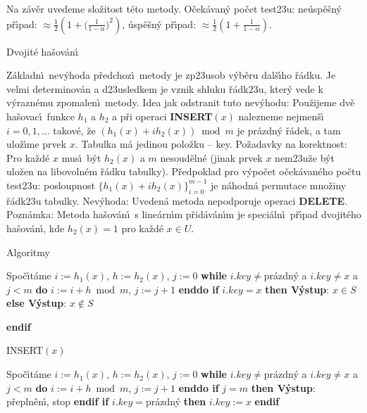 \documentclass[a4paper,12pt]{article}
\begin{document}
\flushpar Na z\'av\v er uvedeme slo\v zitost t\'eto metody. O\v cek\'avan\'y 
po\v cet test\accent23u:\newline 
\phantom{---}ne\'usp\v e\v sn\'y p\v r\'\i pad: $\approx\frac 12(
1+\big(\frac 1{1-\alpha}\big)^2)$, \newline 
\phantom{---}\'usp\v e\v sn\'y p\v r\'\i pad: $\approx\frac 12(1+\frac 
1{1-\alpha})$.

\heading
Dvojit\'e ha\v sov\'an\'\i
\endheading

\flushpar Z\'akladn\'\i\ nev\'yhoda p\v redchoz\'\i\ metody je zp\accent23usob 
v\'yb\v eru dal\-\v s\'\i\-ho \v r\'adku. Je velmi determinov\'an a 
d\accent23usledkem je vznik shluku \v r\'adk\accent23u, kter\'y 
vede k v\'yrazn\'emu zpomalen\'\i\ metody. \newline 
Idea jak odstranit tuto nev\'yhodu: Pou\v zijeme dv\v e 
ha\v sovac\'\i\ funkce $h_1$ a $h_2$ a p\v ri operaci {\bf INSERT$
(x)$ }
nalezneme nejmen\v s\'\i\ $i=0,1,\dots$ takov\'e, \v ze 
$(h_1(x)+ih_2(x))\bmod m$ je pr\'azdn\'y \v r\'adek, a tam ulo\v z\'\i me 
prvek $x$.\newline 
Tabulka m\'a jedinou polo\v zku -- key.\newline 
Po\v zadavky na korektnost: Pro ka\v zd\'e $x$ mus\'\i\ b\'yt $h_
2(x)$ a 
$m$ nesoud\v eln\'e (jinak prvek $x$ nem\accent23u\v ze b\'yt ulo\v zen 
na libovoln\'em \v r\'adku tabulky). \newline 
P\v redpoklad pro v\'ypo\v cet o\v cek\'avan\'eho po\v ctu test\accent23u: posloupnost 
$\{h_1(x)+ih_2(x)\}_{i=0}^{m-1}$ je n\'ahodn\'a permutace mno\v ziny 
\v r\'adk\accent23u tabulky.\newline 
Nev\'yhoda: Uveden\'a metoda nepodporuje operaci {\bf DELETE}. \newline 
Pozn\'amka: Metoda ha\v sov\'an\'\i\ s line\'arn\'\i m p\v rid\'av\'an\'\i m je 
speci\'al\-n\'\i\ p\v r\'\i pad dvojit\'eho ha\v sov\'an\'\i , kde $
h_2(x)=1$ pro 
ka\v zd\'e $x\in U$.
\medskip

\subhead
Algoritmy
\endsubhead
\bigskip

\newline 
Spo\v c\'\i t\'ame $i:=h_1(x)$, $h:=h_2(x)$, $j:=0$\newline 
{\bf while} $i.key\ne$pr\'azdn\'y a $i.key\ne x$ a $j<m$ {\bf do} $
i:=i+h\bmod m$, $j:=j+1$ {\bf enddo\newline 
if} $i.key=x$ {\bf then V\'ystup}: $x\in S$ {\bf else V\'ystup}: $
x\notin S$ {\bf endif
\bigskip

\flushpar INSERT$(x)$}\newline 
Spo\v c\'\i t\'ame $i:=h_1(x)$, $h:=h_2(x)$, $j:=0$\newline 
{\bf while} $i.key\ne$pr\'azdn\'y a $i.key\ne x$ a $j<m$ {\bf do} $
i:=i+h\bmod m$, $j:=j+1$ {\bf enddo\newline 
if} $j=m$ {\bf then V\'ystup}: p\v repln\v en\'\i , stop {\bf endif\newline 
if} $i.key=$pr\'azdn\'y {\bf then} $i.key:=x$ {\bf endif}
\bigskip
\end{document}

